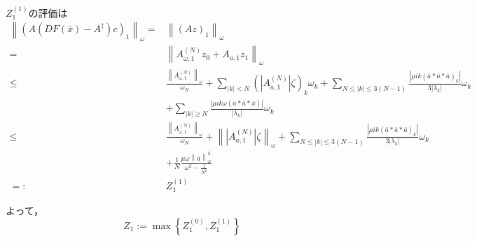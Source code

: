 \documentclass[11pt,a4paper,titlepage]{jsreport}
\theoremstyle{definition}
\begin{document}
$Z_1^{(1)}$の評価は
\begin{equation*}
  \begin{split}
    \left\| (A(DF(\bar{x})-A^\dagger)c)_1 \right\|_\omega =& \left\| (Az)_1 \right\|_\omega \\
    =& \left\| A_{\omega,1}^{(N)} z_0 + A_{a,1} z_1 \right\|_\omega \\
    \leq& \frac{\left\| A_{\omega,1}^{(N)} \right\|_\omega}{\omega_N} + \sum_{|k|<N} \left( \left| A_{a,1}^{(N)} \right| \zeta \right)_k \omega_k + \sum_{N \leq |k| \leq 3(N-1)} \frac{\left| \mu ik \left( \bar{a} * \bar{a} * \bar{a} \right)_k \right|}{3\left| \lambda_k \right|} \omega_k \\
    &+ \sum_{|k| \geq N} \frac{\left| \mu ik \omega \left(\bar{a}*\bar{a}*\bar{x}\right) \right|}{\left| \lambda_k \right|} \omega_k \\
    \leq& \frac{\left\| A_{\omega,1}^{(N)} \right\|_\omega}{\omega_N} + \left\| \left| A_{a,1}^{(N)} \right| \zeta \right\|_\omega + \sum_{N\leq|k|\leq 3(N-1)} \frac{\left| \mu ik \left( \bar{a} * \bar{a} * \bar{a} \right)_k \right|}{3\left| \lambda_k \right|} \omega_k \\
    &+ \frac{1}{N} \frac{\mu \omega \left\|\bar{a}\right\|_\omega^2}{\omega^2-\frac{1}{N^2}}\\
    =:& Z_1^{(1)}
  \end{split}
\end{equation*}

よって，
\begin{equation*}
  Z_1 := \max \left\{ Z_1^{(0)}, Z_1^{(1)} \right\}
\end{equation*}

\end{document}
